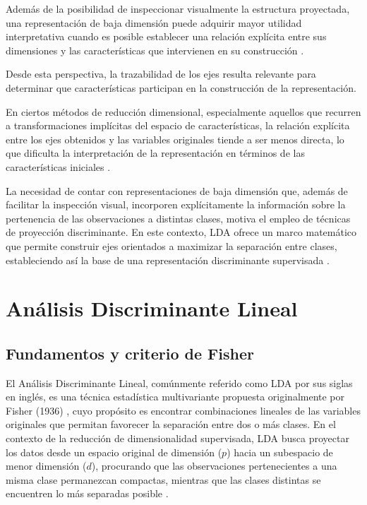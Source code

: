 Además de la posibilidad de inspeccionar visualmente la estructura proyectada, una representación de baja dimensión puede adquirir mayor utilidad interpretativa cuando es posible establecer una relación explícita entre sus dimensiones y las características que intervienen en su construcción \cite{murdoch2019definitions}.

Desde esta perspectiva, la trazabilidad de los ejes resulta relevante para determinar que características participan en la construcción de la representación. 

En ciertos métodos de reducción dimensional, especialmente aquellos que recurren a transformaciones implícitas del espacio de características, la relación explícita entre los ejes obtenidos y las variables originales tiende a ser menos directa, lo que dificulta la interpretación de la representación en términos de las características iniciales \cite{briscik2023improvement}.

La necesidad de contar con representaciones de baja dimensión que, además de facilitar la inspección visual, incorporen explícitamente la información sobre la pertenencia de las observaciones a distintas clases, motiva el empleo de técnicas de proyección discriminante. En este contexto, LDA ofrece un marco matemático que permite construir ejes orientados a maximizar la separación entre clases, estableciendo así la base de una representación discriminante supervisada \cite{zhao2024linear}.






\section{Análisis Discriminante Lineal}

\subsection{Fundamentos y criterio de Fisher}

El Análisis Discriminante Lineal, comúnmente referido como LDA por sus siglas en inglés, es una técnica estadística multivariante propuesta originalmente por Fisher (1936) \cite{fisher1936use}, cuyo propósito es encontrar combinaciones lineales de las variables originales que permitan favorecer la separación entre dos o más clases. En el contexto de la reducción de dimensionalidad supervisada, LDA busca proyectar los datos desde un espacio original de dimensión ($p$) hacia un subespacio de menor dimensión ($d$), procurando que las observaciones pertenecientes a una misma clase permanezcan compactas, mientras que las clases distintas se encuentren lo más separadas posible \cite{zhao2024linear}.


